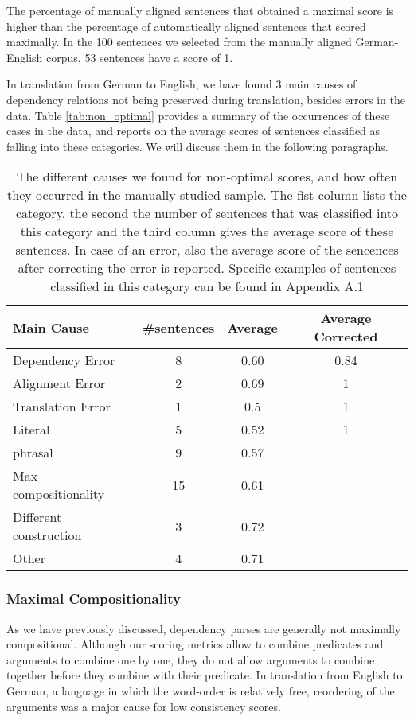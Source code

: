 The percentage of manually aligned sentences that obtained a maximal score is higher than the percentage of automatically aligned sentences that scored maximally. In the 100 sentences we selected from the manually aligned German-English corpus, 53 sentences have a score of 1.

In translation from German to English, we have found 3 main causes of dependency relations not being preserved during translation, besides errors in the data. Table \ref{tab:non_optimal} provides a summary of the occurrences of these cases in the data, and reports on the average scores of sentences classified as falling into these categories. We will discuss them in the following paragraphs. 

\begin{table}[!ht]
\centering
\begin{tabular}{|l|c|c|c|}
\hline
\textbf{Main Cause} & \textbf{\#sentences} & \textbf{Average} & \textbf{Average Corrected}\\
\hline \hline
Dependency Error & 8 & 0.60 & 0.84\\
\hline
Alignment Error & 2 & 0.69 & 1\\
\hline
Translation Error & 1 & 0.5 & 1\\
\hline
Literal & 5 & 0.52 & 1\\
\hline
phrasal& 9 & 0.57\\
\cline{1-3}
Max compositionality & 15 & 0.61 \\
\cline{1-3}
Different construction & 3 & 0.72 \\
\cline{1-3}
Other & 4 & 0.71\\
\cline{1-3}
\end{tabular}
\caption{The different causes we found for non-optimal scores, and how often they occurred in the manually studied sample. The fist column lists the category, the second the number of sentences that was classified into this category and the third column gives the average score of these sentences. In case of an error, also the average score of the sencences after correcting the error is reported. Specific examples of sentences classified in this category can be found in Appendix A.1}
\end{table}

\subsubsection{Maximal Compositionality}

As we have previously discussed, dependency parses are generally not maximally compositional. Although our scoring metrics allow to combine predicates and arguments to combine one by one, they do not allow arguments to combine together before they combine with their predicate. In translation from English to German, a language in which the word-order is relatively free, reordering of the arguments was a major cause for low consistency scores.

